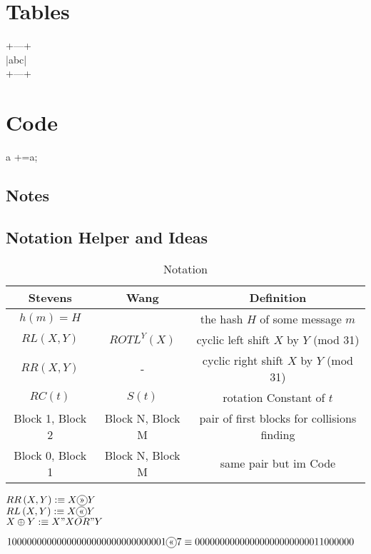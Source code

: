 \chapter{Tables}
+---+\\
|abc|\\
+---+
\chapter{Code}
a +=a;\\


\section*{Notes}




\section{Notation Helper and Ideas}


\begin{table}[]
    \caption*{\large Notation}
    \begin{tabular}{ c | c | c }
    Stevens & Wang  & Definition  \\
    \hline 
    $h(m) = H$ &  & the hash $H$ of some message $m$\\
    $ RL \left(X , Y \right) $  & $ ROTL^{Y} \left( X\right) $  & cyclic left shift $X$ by $Y$ (mod 31) \\
    $ RR \left(X , Y \right) $  & -                             & cyclic right shift $X$ by $Y$ (mod 31) \\
    $ RC \left(t \right) $      &$ S \left(t \right) $          & rotation Constant of $t$ \\
    Block 1, Block 2 & Block N, Block M & pair of first blocks for collisions finding   \\
    Block 0, Block 1 & Block N, Block M & same pair but im Code\\
    \end{tabular}
    \label{notation}
\end{table}

$RR\left(X,Y\right) :\equiv X  \circled{>>} Y$\\
$RL\left(X,Y\right) :\equiv X  \circled{<<} Y$\\
$X \oplus Y :\equiv X "XOR"  Y$


\begin{align*}
10000000000000000000000000000001  \circled{<<} 7 &\equiv 00000000000000000000000011000000
\end{align*}
  


